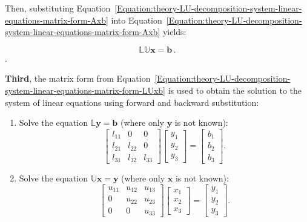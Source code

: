 Then, substituting Equation~\ref{Equation:theory-LU-decomposition-system-linear-equations-matrix-form-Axb} into Equation~\ref{Equation:theory-LU-decomposition-system-linear-equations-matrix-form-Axb} yields:

\begin{equation}\label{Equation:theory-LU-decomposition-system-linear-equations-matrix-form-LUxb}
	\mathbb{LU}\textbf{x} = \textbf{b}\,.
\end{equation}.

\par \textbf{Third}, the matrix form from Equation~\ref{Equation:theory-LU-decomposition-system-linear-equations-matrix-form-LUxb} is used to obtain the solution to the system of linear equations using forward and backward substitution:

\begin{enumerate}
	\item Solve the equation $ \mathbb{L}\textbf{y} = \textbf{b} $ (where only $ \textbf{y} $ is not known):
	\begin{equation}\label{Equation:theory-LU-decomposition-solving-Lyb}
		\begin{bmatrix}
			l_{11} & 0      & 0          \\
			l_{21} & l_{22} & 0          \\
			l_{31} & l_{32} & l_{33}
		\end{bmatrix}
		\begin{bmatrix}
			y_{1} \\
			y_{2} \\
			y_{3}
		\end{bmatrix}
		=
		\begin{bmatrix}
			b_{1} \\
			b_{2} \\
			b_{3}
		\end{bmatrix}.
	\end{equation}
	\item Solve the equation $ \mathbb{U}\textbf{x} = \textbf{y} $ (where only $ \textbf{x} $ is not known):
	\begin{equation}\label{Equation:theory-LU-decomposition-solving-Uxy}
		\begin{bmatrix}
			u_{11} & u_{12} & u_{13} \\
			0      & u_{22} & u_{23} \\
			0      & 0      & u_{33}
		\end{bmatrix}
		\begin{bmatrix}
			x_{1} \\
			x_{2} \\
			x_{3}
		\end{bmatrix}
		=
		\begin{bmatrix}
			y_{1} \\
			y_{2} \\
			y_{3}
		\end{bmatrix}.
	\end{equation}
\end{enumerate}

